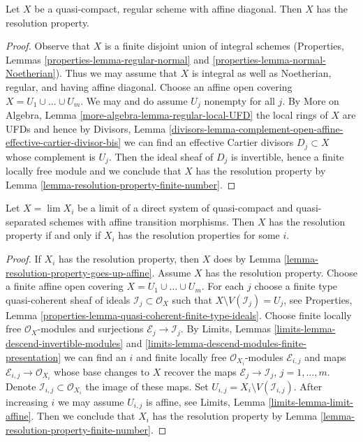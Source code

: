 \begin{lemma}
\label{lemma-regular-resolution-property}
Let $X$ be a quasi-compact, regular scheme with affine diagonal.
Then $X$ has the resolution property.
\end{lemma}

\begin{proof}
Observe that $X$ is a finite disjoint union of integral schemes
(Properties, Lemmas
\ref{properties-lemma-regular-normal} and
\ref{properties-lemma-normal-Noetherian}).
Thus we may assume that $X$ is integral as well as Noetherian,
regular, and having affine diagonal.
Choose an affine open covering $X = U_1 \cup \ldots \cup U_m$.
We may and do assume $U_j$ nonempty for all $j$.
By More on Algebra, Lemma \ref{more-algebra-lemma-regular-local-UFD}
the local rings of $X$ are UFDs and hence by Divisors, Lemma
\ref{divisors-lemma-complement-open-affine-effective-cartier-divisor-bis}
we can find an effective Cartier divisors $D_j \subset X$
whose complement is $U_j$. Then the ideal sheaf of $D_j$ is
invertible, hence a finite locally free module and we conclude
that $X$ has the resolution property by
Lemma \ref{lemma-resolution-property-finite-number}.
\end{proof}

\begin{lemma}
\label{lemma-resolution-property-descends}
Let $X = \lim X_i$ be a limit of a direct system of quasi-compact
and quasi-separated schemes with affine transition morphisms.
Then $X$ has the resolution property if and only if $X_i$ has
the resolution properties for some $i$.
\end{lemma}

\begin{proof}
If $X_i$ has the resolution property, then $X$ does by
Lemma \ref{lemma-resolution-property-goes-up-affine}.
Assume $X$ has the resolution property.
Choose a finite affine open covering
$X = U_1 \cup \ldots \cup U_m$.
For each $j$ choose a finite type quasi-coherent sheaf
of ideals $\mathcal{I}_j \subset \mathcal{O}_X$
such that $X \setminus V(\mathcal{I}_j) = U_j$, see
Properties, Lemma \ref{properties-lemma-quasi-coherent-finite-type-ideals}.
Choose finite locally free $\mathcal{O}_X$-modules
and surjections $\mathcal{E}_j \to \mathcal{I}_j$.
By Limits, Lemmas \ref{limits-lemma-descend-invertible-modules} and
\ref{limits-lemma-descend-modules-finite-presentation}
we can find an $i$ and finite locally free
$\mathcal{O}_{X_i}$-modules $\mathcal{E}_{i, j}$
and maps $\mathcal{E}_{i, j} \to \mathcal{O}_{X_i}$
whose base changes to $X$ recover the maps
$\mathcal{E}_j \to \mathcal{I}_j$, $j = 1, \ldots, m$.
Denote $\mathcal{I}_{i, j} \subset \mathcal{O}_{X_i}$
the image of these maps.
Set $U_{i, j} = X_i \setminus V(\mathcal{I}_{i, j})$.
After increasing $i$ we may assume $U_{i, j}$ is affine, see
Limits, Lemma \ref{limits-lemma-limit-affine}.
Then we conclude that $X_i$ has the resolution property
by Lemma \ref{lemma-resolution-property-finite-number}.
\end{proof}

